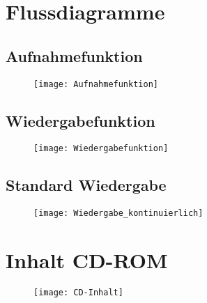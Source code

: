 
\newpage
\appendix
\section{Flussdiagramme}
\subsection{Aufnahmefunktion}
\label{fluss:recf}
\begin{figure}[h]
	\begin{center}
		\texttt{[image: Aufnahmefunktion]}
	\end{center}
\end{figure}
\newpage
\subsection{Wiedergabefunktion}
\label{fluss:playf}
\begin{figure}[h]
	\begin{center}
		\texttt{[image: Wiedergabefunktion]}
	\end{center}
\end{figure}
\newpage
\subsection{Standard Wiedergabe}
\label{fluss:playconti}
\begin{figure}[h]
	\begin{center}
		\texttt{[image: Wiedergabe\_kontinuierlich]}
	\end{center}
\end{figure}
\newpage
\section{Inhalt CD-ROM}
\label{CD-Anhang}
\begin{figure}[h]
	\texttt{[image: CD-Inhalt]}
\end{figure}
